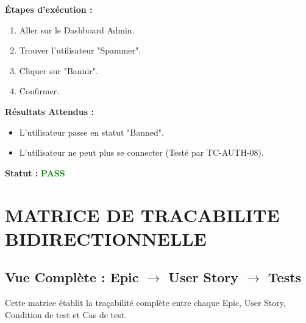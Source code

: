 \documentclass[12pt,a4paper]{article}
\begin{document}
\vspace{0.5cm}
\textbf{Étapes d'exécution :}
\begin{enumerate}
    \item Aller sur le Dashboard Admin.
    \item Trouver l'utilisateur "Spammer".
    \item Cliquer sur "Bannir".
    \item Confirmer.
\end{enumerate}

\vspace{0.5cm}
\textbf{Résultats Attendus :}
\begin{itemize}
    \item L'utilisateur passe en statut "Banned".
    \item L'utilisateur ne peut plus se connecter (Testé par TC-AUTH-08).
\end{itemize}

\vspace{0.5cm}
\textbf{Statut :} \textcolor{green}{\textbf{PASS}}

\section{MATRICE DE TRACABILITE BIDIRECTIONNELLE}

\subsection{Vue Complète : Epic $\rightarrow$ User Story $\rightarrow$ Tests}
Cette matrice établit la traçabilité complète entre chaque Epic, User Story, Condition de test et Cas de test.
\end{document}
